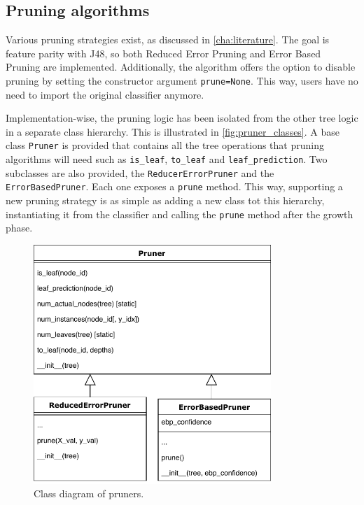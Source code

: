 \subsection{Pruning algorithms}
Various pruning strategies exist, as discussed in \autoref{cha:literature}. The goal is feature parity with J48, so both Reduced Error Pruning and Error Based Pruning are implemented. Additionally, the algorithm offers the option to disable pruning by setting the constructor argument \texttt{prune=None}. This way, users have no need to import the original classifier anymore.

Implementation-wise, the pruning logic has been isolated from the other tree logic in a separate class hierarchy. This is illustrated in \autoref{fig:pruner_classes}. A base class \texttt{Pruner} is provided that contains all the tree operations that pruning algorithms will need such as \texttt{is\_leaf}, \texttt{to\_leaf} and \texttt{leaf\_prediction}. Two subclasses are also provided, the \texttt{ReducerErrorPruner} and the \texttt{ErrorBasedPruner}. Each one exposes a \texttt{prune} method. This way, supporting a new pruning strategy is as simple as adding a new class tot this hierarchy, instantiating it from the classifier and calling the \texttt{prune} method after the growth phase.

\begin{figure}[htp]
    \centering
    \includegraphics[width=0.8\textwidth]{img/PrunerClasses.pdf}
    \caption{Class diagram of pruners.}%
    \label{fig:pruner_classes}
\end{figure}

